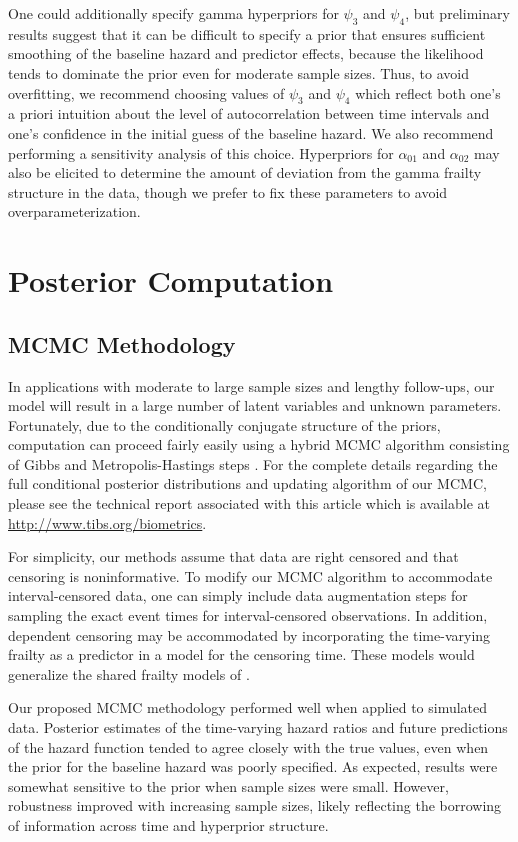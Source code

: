 \documentclass[10pt, letterpaper]{article}
\begin{document}
One could additionally specify gamma hyperpriors for $\psi_3$ and $\psi_4$, but preliminary results suggest that it can be difficult to specify a prior that ensures sufficient smoothing of the baseline hazard and predictor effects, because the likelihood tends to dominate the prior even for moderate sample sizes. Thus, to avoid overfitting, we recommend choosing values of $\psi_3$ and $\psi_4$ which reflect both one's a priori intuition about the level of autocorrelation between time intervals and one's confidence in the initial guess of the baseline hazard. We also recommend performing a sensitivity analysis of this choice. Hyperpriors for $\alpha_{01}$ and $\alpha_{02}$ may also be elicited to determine the amount of deviation from the gamma frailty structure in the data, though we prefer to fix these parameters to avoid overparameterization.

\section{Posterior Computation}

\subsection{MCMC Methodology}

In applications with moderate to large sample sizes and lengthy follow-ups, our model will result in a large number of latent variables and unknown parameters. Fortunately, due to the conditionally conjugate structure of the priors, computation can proceed fairly easily using a hybrid MCMC algorithm consisting of Gibbs and Metropolis-Hastings steps \citep{Gelfand1990, Tierney1994}. For the complete details regarding the full conditional posterior distributions and updating algorithm of our MCMC, please see the technical report associated with this article which is available at \url{http://www.tibs.org/biometrics}.

For simplicity, our methods assume that data are right censored and that censoring is noninformative. To modify our MCMC algorithm to accommodate interval-censored data, one can simply include data augmentation steps for sampling the exact event times for interval-censored observations. In addition, dependent censoring may be accommodated by incorporating the time-varying frailty as a predictor in a model for the censoring time. These models would generalize the shared frailty models of \citet{Liu2004}.

Our proposed MCMC methodology performed well when applied to simulated data. Posterior estimates of the time-varying hazard ratios and future predictions of the hazard function tended to agree closely with the true values, even when the prior for the baseline hazard was poorly specified. As expected, results were somewhat sensitive to the prior when sample sizes were small. However, robustness improved with increasing sample sizes, likely reflecting the borrowing of information across time and hyperprior structure.
\end{document}
